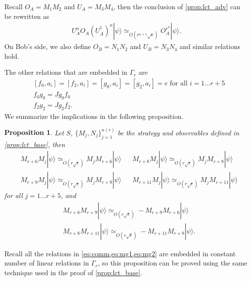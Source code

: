 \documentclass[11pt,letterpaper]{article}
\newcommand{\ket}[1]{|#1\rangle}
\newcommand{\ct}{^{\dagger}}
\newcommand{\1}{\mathbb{1}}
\newcommand{\nr}{n(r)}
\newcommand{\se}{\sqrt{\epsilon}}
\newcommand{\appd}[1]{\simeq_{#1}}
\newtheorem{proposition}[theorem]{Proposition}
\theoremstyle{definition}
\begin{document}

Recall $O_A = M_1M_2$ and $U_A=M_3M_4$, then
the conclusion of \cref{prop:lct_adv} can be rewritten as 
\begin{align*}
	U_A^n O_A (U_A\ct)^n \ket{\psi} \appd{O(r^{n+1} \se)} O_A^{r^n} \ket{\psi}.
\end{align*}
On Bob's side, we also define $O_B = N_1N_2$ and $U_B = N_3N_4$ 
and similar relations hold.

The other relations that are embedded in $\Gamma_r$ are 
\begin{align}
	\label{eq:comm}&[f_0, a_i] = [f_2, a_i] = [g_0, a_i] = [g_2, a_i] = e \text{ for all } i = 1 \dots r+5 \\
	\label{eq:mg1}&f_0g_0 = Jg_0f_0 \\
	\label{eq:mg2}&f_2g_2 = J g_2 f_2.
\end{align}
We summarize the implications in the following proposition.
\begin{proposition}
	\label{prop:lct_comm}
	Let $S$, $\{M_j, N_j\}_{j=1}^{\nr}$ be the strategy and observables defined in \cref{prop:lct_base},
	then
	\begin{align}
		&M_{r+6} M_j \ket{\psi} \appd{O(r\se)} M_j M_{r+6} \ket{\psi} && 
		M_{r+8}M_j \ket{\psi} \appd{O(r\se)} M_j M_{r+8} \ket{\psi} \\
		&M_{r+9} M_j \ket{\psi} \appd{O(r\se)} M_j M_{r+9} \ket{\psi} && 
		M_{r+11}M_j \ket{\psi} \appd{O(r\se)} M_j M_{r+11} \ket{\psi} 
	\end{align}
	for all $j = 1 \dots r+5$, and
	\begin{align}
		&M_{r+6}M_{r+9} \ket{\psi} \appd{O(r\se)} - M_{r+9}M_{r+6} \ket{\psi} \\
		&M_{r+8}M_{r+11} \ket{\psi} \appd{O(r\se)} -M_{r+11}M_{r+8} \ket{\psi}.
	\end{align}
\end{proposition}
Recall all the relations in \cref{eq:comm,eq:mg1,eq:mg2} are embedded in constant number of linear relations in $\Gamma_r$,
so this proposition can be proved using the same technique used in the proof of \cref{prop:lct_base}.
\end{document}
